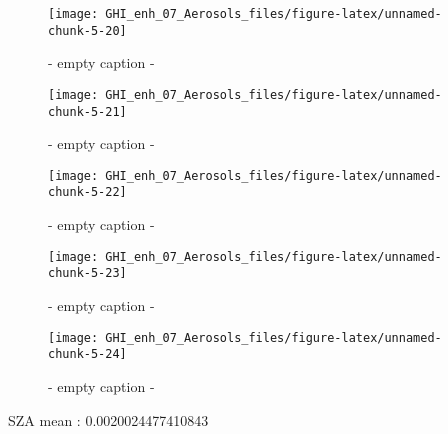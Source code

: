 \documentclass[
  10pt,
  a4paper,oneside]{article}
\begin{document}
\begin{figure}[H]

{\centering \texttt{[image: GHI\_enh\_07\_Aerosols\_files/figure-latex/unnamed-chunk-5-20]} 

}

\caption{ - empty caption - }\label{fig:unnamed-chunk-5-20}
\end{figure}
\begin{figure}[H]

{\centering \texttt{[image: GHI\_enh\_07\_Aerosols\_files/figure-latex/unnamed-chunk-5-21]} 

}

\caption{ - empty caption - }\label{fig:unnamed-chunk-5-21}
\end{figure}
\begin{figure}[H]

{\centering \texttt{[image: GHI\_enh\_07\_Aerosols\_files/figure-latex/unnamed-chunk-5-22]} 

}

\caption{ - empty caption - }\label{fig:unnamed-chunk-5-22}
\end{figure}
\begin{figure}[H]

{\centering \texttt{[image: GHI\_enh\_07\_Aerosols\_files/figure-latex/unnamed-chunk-5-23]} 

}

\caption{ - empty caption - }\label{fig:unnamed-chunk-5-23}
\end{figure}
\begin{figure}[H]

{\centering \texttt{[image: GHI\_enh\_07\_Aerosols\_files/figure-latex/unnamed-chunk-5-24]} 

}

\caption{ - empty caption - }\label{fig:unnamed-chunk-5-24}
\end{figure}

SZA mean : 0.0020024477410843
\end{document}
